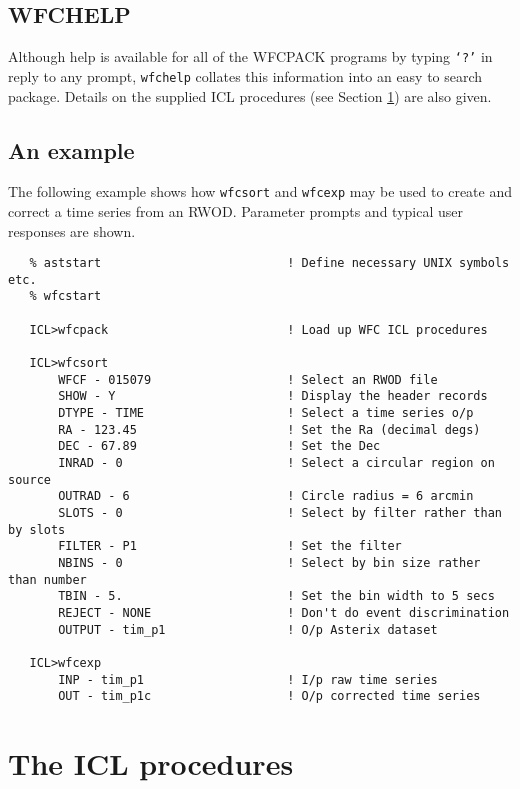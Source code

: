 \subsection{WFCHELP}
\label{sec:programs:wfchelp}

Although help is available for all of the WFCPACK programs by typing
{\tt `?'} in reply to any prompt, {\tt wfchelp} collates this information
into an easy to search package. Details on the supplied ICL procedures
(see Section \ref{sec:procedures}) are also given.

\subsection{An example}
\label{sec:programs:example}

The following example shows how {\tt wfcsort} and {\tt wfcexp} may be
used to create and correct a time series from an RWOD. Parameter
prompts and typical user responses are shown.

\begin{verbatim}
   % aststart                          ! Define necessary UNIX symbols etc.
   % wfcstart

   ICL>wfcpack                         ! Load up WFC ICL procedures

   ICL>wfcsort
       WFCF - 015079                   ! Select an RWOD file
       SHOW - Y                        ! Display the header records
       DTYPE - TIME                    ! Select a time series o/p
       RA - 123.45                     ! Set the Ra (decimal degs)
       DEC - 67.89                     ! Set the Dec
       INRAD - 0                       ! Select a circular region on source
       OUTRAD - 6                      ! Circle radius = 6 arcmin
       SLOTS - 0                       ! Select by filter rather than by slots
       FILTER - P1                     ! Set the filter
       NBINS - 0                       ! Select by bin size rather than number
       TBIN - 5.                       ! Set the bin width to 5 secs
       REJECT - NONE                   ! Don't do event discrimination
       OUTPUT - tim_p1                 ! O/p Asterix dataset

   ICL>wfcexp
       INP - tim_p1                    ! I/p raw time series
       OUT - tim_p1c                   ! O/p corrected time series

\end{verbatim}

\section{The ICL procedures}
\label{sec:procedures}

